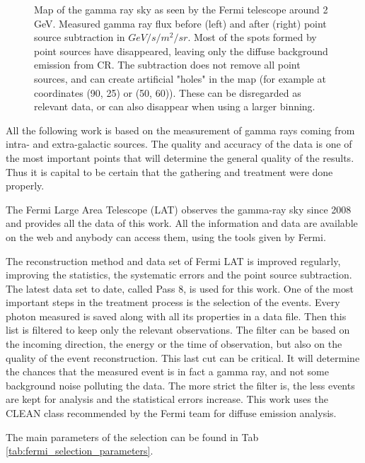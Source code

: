 \begin{figure}[h]
\begin{minipage}[h]{0.45\textwidth}
	  \subcaption{}
	  \label{fig:data_ptsrc_subtracted}
  \end{minipage}
  \caption{Map of the gamma ray sky as seen by the Fermi telescope around 2 GeV. Measured gamma ray flux before (left) and after (right) point source subtraction in $GeV/s/m^2/sr$. Most of the spots formed by point sources have disappeared, leaving only the diffuse background emission from CR. The subtraction does not remove all point sources, and can create artificial "holes" in the map (for example at coordinates (90, 25) or (50, 60)). These can be disregarded as relevant data, or can also disappear when using a larger binning.}
  \label{fig:method_pass8} 
\end{figure}

All the following work is based on the measurement of gamma rays coming from intra- and extra-galactic sources. The quality and accuracy of the data is one of the most important points that will determine the general quality of the results. Thus it is capital to be certain that the gathering and treatment were done properly.

The Fermi Large Area Telescope (LAT) observes the gamma-ray sky since 2008 and provides all the data of this work. 
All the information and data are available on the web and anybody can access them, using the tools given by Fermi. 

The reconstruction method and data set of Fermi LAT is improved regularly, improving the statistics, the systematic errors and the point source subtraction. The latest data set to date, called Pass 8, is used for this work.
One of the most important steps in the treatment process is the selection of the events. Every photon measured is saved along with all its properties in a data file. Then this list is filtered to keep only the relevant observations. The filter can be based on the incoming direction, the energy or the time of observation, but also on the quality of the event reconstruction. This last cut can be critical. It will determine the chances that the measured event is in fact a gamma ray, and not some background noise polluting the data. The more strict the filter is, the less events are kept for analysis and the statistical errors increase. This work uses the CLEAN class recommended by the Fermi team for diffuse emission analysis. 

The main parameters of the selection can be found in Tab \ref{tab:fermi_selection_parameters}.


